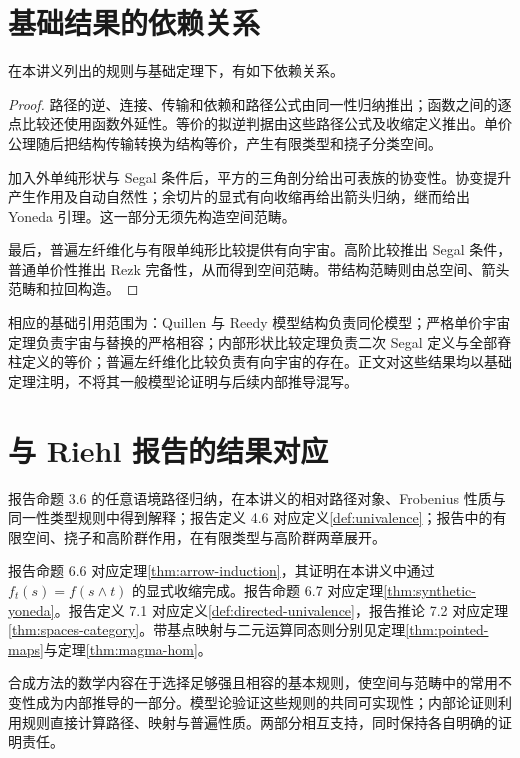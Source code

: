\section{基础结果的依赖关系}
\begin{proposition}[内部结论的依赖]
在本讲义列出的规则与基础定理下，有如下依赖关系。
\end{proposition}
\begin{proof}
路径的逆、连接、传输和依赖和路径公式由同一性归纳推出；函数之间的逐点比较还使用函数外延性。等价的拟逆判据由这些路径公式及收缩定义推出。单价公理随后把结构传输转换为结构等价，产生有限类型和挠子分类空间。

加入外单纯形状与 Segal 条件后，平方的三角剖分给出可表族的协变性。协变提升产生作用及自动自然性；余切片的显式有向收缩再给出箭头归纳，继而给出 Yoneda 引理。这一部分无须先构造空间范畴。

最后，普遍左纤维化与有限单纯形比较提供有向宇宙。高阶比较推出 Segal 条件，普通单价性推出 Rezk 完备性，从而得到空间范畴。带结构范畴则由总空间、箭头范畴和拉回构造。
\end{proof}
\begin{remark}
相应的基础引用范围为：Quillen 与 Reedy 模型结构负责同伦模型；严格单价宇宙定理负责宇宙与替换的严格相容；内部形状比较定理负责二次 Segal 定义与全部脊柱定义的等价；普遍左纤维化比较负责有向宇宙的存在。正文对这些结果均以基础定理注明，不将其一般模型论证明与后续内部推导混写。
\end{remark}

\section{与 Riehl 报告的结果对应}
\begin{remark}
报告命题 3.6 的任意语境路径归纳，在本讲义的相对路径对象、Frobenius 性质与同一性类型规则中得到解释；报告定义 4.6 对应定义\ref{def:univalence}；报告中的有限空间、挠子和高阶群作用，在有限类型与高阶群两章展开。

报告命题 6.6 对应定理\ref{thm:arrow-induction}，其证明在本讲义中通过 $f_t(s)=f(s\wedge t)$ 的显式收缩完成。报告命题 6.7 对应定理\ref{thm:synthetic-yoneda}。报告定义 7.1 对应定义\ref{def:directed-univalence}，报告推论 7.2 对应定理\ref{thm:spaces-category}。带基点映射与二元运算同态则分别见定理\ref{thm:pointed-maps}与定理\ref{thm:magma-hom}。
\end{remark}
\begin{remark}
合成方法的数学内容在于选择足够强且相容的基本规则，使空间与范畴中的常用不变性成为内部推导的一部分。模型论验证这些规则的共同可实现性；内部论证则利用规则直接计算路径、映射与普遍性质。两部分相互支持，同时保持各自明确的证明责任。
\end{remark}
